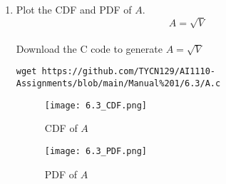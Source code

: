 \documentclass[journal,12pt,twocolumn]{IEEEtran}
\renewcommand\thesection{\arabic{section}}
\begin{document}
\begin{enumerate}[label=\thesection.\arabic*
,ref=\thesection.\theenumi]
\begin{align}
                                       & = \int_0^{2\pi} \frac{r}{2\pi} e^{-\frac{r^2}{2}} d\theta                                    \\
                                       & = r e^{-\frac{r^2}{2}}                                                                       \\
              \intertext{CDF is given by,}
              F_R(r) &= \int_0^r\exp{-\frac{r^2}{2}}\\
              &= 1 - \exp{\frac{-r^2}{2}}\\
              \intertext{And,}
              V                        & = X_1^2 + X_2^2                                                                              \\
                                       & = R^2
              \intertext{Now,}
              F_V(x)                   & = \pr{V\le x}                                                                                \\
                                       & = \pr{R^2 \le x}                                                                             \\
                                       & = \pr{R \le \sqrt{x}}                                                                        \\
              F_V(x)                   & = F_R(\sqrt{x})                                                                              \\
                                       & =\begin{cases}
                  0, & x < 0 \\
                  1 - e^{-\frac{x}{2}} & x \geq 0
              \end{cases}
          \end{align}

\begin{align}
    \alpha = \frac{1}{2}
\end{align}

\item Plot the CDF and PDF of $A$.
\begin{equation}
    A = \sqrt{V}
\end{equation}
\solution\\
Download the C code to generate $A = \sqrt{V}$\\
\begin{lstlisting}
wget https://github.com/TYCN129/AI1110-Assignments/blob/main/Manual%201/6.3/A.c
\end{lstlisting}

\begin{figure}[h!]
    \centering
    \texttt{[image: 6.3\_CDF.png]}
    \caption{CDF of $A$}
    \label{fig:my_label}
\end{figure}
\begin{figure}[H]
    \centering
    \texttt{[image: 6.3\_PDF.png]}
    \caption{PDF of $A$}
    \label{fig:my_label}
\end{figure}
\end{enumerate}
\end{document}
